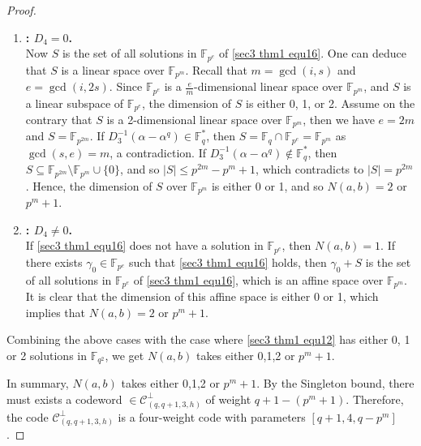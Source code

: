 \documentclass[sn-mathphys-num]{sn-jnl}%
\theoremstyle{thmstyleone}%
\theoremstyle{thmstyletwo}%
\theoremstyle{thmstylethree}%
\begin{document}
\begin{proof}
\begin{enumerate}[label = \bf Case \arabic*:, leftmargin=4.1em]
\begin{enumerate}[label=\bf Case 3.\arabic*:]
			\begin{enumerate}[label = \bf Case]
				\item \textbf{: $D_4 = 0$.}\\
				Now $S$ is the set of all solutions in $\mathbb{F}_{p^e}$ of \cref{sec3 thm1 equ16}. One can deduce that $S$ is a linear space over $\mathbb{F}_{p^m}$. Recall that $m=\gcd(i,s)$ and $e=\gcd(i,2s)$. Since $\mathbb{F}_{p^e}$ is a $\frac{e}{m}$-dimensional linear space over $\mathbb{F}_{p^m}$, and $S$ is a linear subspace of $\mathbb{F}_{p^e}$, the dimension of $S$ is either 0, 1, or 2. Assume on the contrary that $S$ is a 2-dimensional linear space over $\mathbb{F}_{p^m}$, then we have $e=2m$ and $S=\mathbb{F}_{p^{2m}}$. If $D_3^{-1}(\alpha-\alpha^q) \in \mathbb{F}_{q}^\ast$, then $S=\mathbb{F}_q \cap \mathbb{F}_{p^e}=\mathbb{F}_{p^m}$ as $\gcd(s,e)=m$, a contradiction. If $D_3^{-1}(\alpha-\alpha^q) \notin \mathbb{F}_{q}^\ast$, then $S\subseteq \mathbb{F}_{p^{2m}}\setminus\mathbb{F}_{p^m}\cup\{0\}$, and so $|S| \le p^{2m}-p^m+1$, which contradicts to $|S| = p^{2m}$. Hence, the dimension of $S$ over $\mathbb{F}_{p^m}$ is either 0 or 1, and so $N(a,b)=2$ or $p^m+1$.
				\item \textbf{: $D_4 \ne 0$.}\\
				If \cref{sec3 thm1 equ16} does not have a solution in $\mathbb{F}_{p^e}$, then $N(a,b)=1$. If there exists $\gamma_0 \in \mathbb{F}_{p^e}$ such that \cref{sec3 thm1 equ16} holds, then $\gamma_0+S$ is the set of all solutions in $\mathbb{F}_{p^e}$ of \cref{sec3 thm1 equ16}, which is an affine space over $\mathbb{F}_{p^m}$. It is clear that the dimension of this affine space is either 0 or 1, which implies that $N(a,b)=2$ or $p^m+1$.
			\end{enumerate}
			Combining the above cases with the case where \cref{sec3 thm1 equ12} has either 0, 1 or 2 solutions in $\mathbb{F}_{q^2}$, we get $N(a,b)$ takes either 0,1,2 or $p^m+1$.
		\end{enumerate}
	\end{enumerate}
	In summary, $N(a,b)$ takes either 0,1,2 or $p^m+1$. By the Singleton bound, there must exists a codeword $\in \mathcal{C}^\perp_{(q,q+1,3,h)}$ of weight $q+1-(p^m+1)$. Therefore, the code $\mathcal{C}^\perp_{(q,q+1,3,h)}$ is a four-weight code with parameters $[q+1,4,q-p^m]$.
\end{proof}
\end{document}
